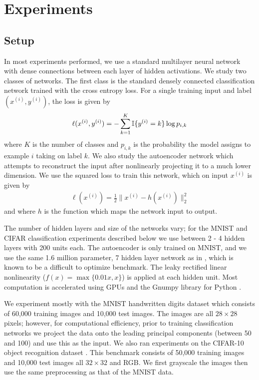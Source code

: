 \section{Experiments}

\subsection{Setup}
In most experiments performed, we use a standard multilayer neural network with
dense connections between each layer of hidden activations. We study two
classes of networks. The first class is the standard densely connected
classification network trained with the cross entropy loss. For a single
training input and label $(x^{(i)},y^{(i)})$, the loss is given by
\begin{align}
\ell (x^{(i)},y^{(i)}) = - \sum_{k=1}^K \mathbb{I}\{y^{(i)} = k\} \log p_{i,k}
\end{align}
where $K$ is the number of classes and $p_{i,k}$ is the probability the model
assigns to example $i$ taking on label $k$. We also study the autoencoder
network which attempts to reconstruct the input after nonlinearly projecting it
to a much lower dimension. We use the squared loss to train this network, which
on input $x^{(i)}$ is given by
\begin{align}
\ell(x^{(i)}) = \frac{1}{2} \|x^{(i)} - h(x^{(i)})\|_2^2
\end{align}
and where $h$ is the function which maps the network input to output.

The number of hidden layers and size of the networks vary; for the MNIST and
CIFAR classification experiments described below we use between 2 - 4 hidden
layers with 200 units each. The autoencoder is only trained on MNIST, and we
use the same 1.6 million parameter, 7 hidden layer network as in
\cite{hinton_2006}, which is known to be a difficult to optimize benchmark. The
leaky rectified linear nonlinearity ($f(x) = \max\{0.01x,x\}$) is applied at
each hidden unit.  Most computation is accelerated using GPUs and the Gnumpy
library for Python \cite{tielemen_2010}.

We experiment mostly with the MNIST handwritten digits dataset which consists
of 60,000 training images and 10,000 test images. The images are all
$28\times28$ pixels; however, for computational efficiency, prior to training
classification networks we project the data onto the leading principal
components (between 50 and 100) and use this as the input. We also ran
experiments on the CIFAR-10 object recognition dataset \cite{krizhevsky_2009}.
This benchmark consists of 50,000 training images and 10,000 test images all
$32 \times 32$ and RGB. We first grayscale the images then use the same
preprocessing as that of the MNIST data.

